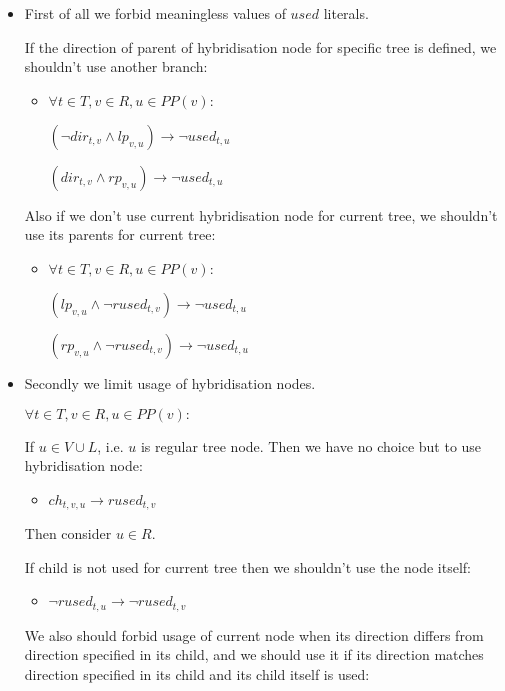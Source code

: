 \documentclass[runningheads, envcountsame, a4paper]{llncs}
\begin{document}
\begin{itemize}

\item First of all we forbid meaningless values of $used$ literals.

	If the direction of parent of hybridisation node for specific tree is defined, we shouldn't use another branch:
    \begin{itemize}
    \item $\forall t \in T, v \in R, u \in PP(v):$
    
    $(\neg dir_{t,v} \wedge lp_{v,u}) \rightarrow \neg used_{t,u}$
    
    $(dir_{t,v} \wedge rp_{v,u}) \rightarrow \neg used_{t,u}$
    \end{itemize}
	Also if we don't use current hybridisation node for current tree, we shouldn't use its parents for current tree:
	\begin{itemize}
	\item $\forall t \in T, v \in R, u \in PP(v):$
	
	$(lp_{v,u} \wedge \neg rused_{t,v}) \rightarrow \neg used_{t,u}$
	
	$(rp_{v,u} \wedge \neg rused_{t,v}) \rightarrow \neg used_{t,u}$
	\end{itemize}

\item Secondly we limit usage of hybridisation nodes.

	$\forall t \in T, v \in R, u \in PP(v):$
	
    If $u \in V \cup L$, i.e. $u$ is regular tree node. Then we have no choice but to use hybridisation node:

    \begin{itemize}
	\item $ch_{t,v,u} \rightarrow rused_{t,v}$
	\end{itemize}
    
    Then consider $u \in R$.
    
    If child is not used for current tree then we shouldn't use the node itself:

    \begin{itemize}
    \item $\neg rused_{t,u} \rightarrow \neg rused_{t,v}$
    \end{itemize}

	We also should forbid usage of current node when its direction differs from direction specified in its child, and we should use it if its direction matches direction specified in its child and its child itself is used:


\end{itemize}
\end{document}
